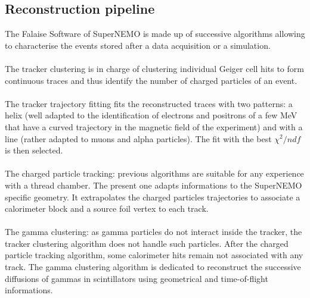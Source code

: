 \subsection{Reconstruction pipeline}

The Falaise Software of SuperNEMO is made up of successive algorithms allowing to characterise the events stored after a data acquisition or a simulation.
\paragraph{} The tracker clustering is in charge of clustering individual Geiger cell hits to form continuous traces and thus identify the number of charged particles of an event.
\paragraph{} The tracker trajectory fitting fits the reconstructed traces with two patterns: a helix (well adapted to the identification of electrons and positrons of a few MeV that have a curved trajectory in the magnetic field of the experiment) and with a line (rather adapted to muons and alpha particles).
The fit with the best $\chi^{2}/ndf$ is then selected.
\paragraph{} The charged particle tracking: previous algorithms are suitable for any experience with a thread chamber.
The present one adapts informations to the SuperNEMO specific geometry.
It extrapolates the charged particles trajectories to associate a calorimeter block and a source foil vertex to each track.
\paragraph{} The gamma clustering: as gamma particles do not interact inside the tracker, the tracker clustering algorithm does not handle such particles.
After the charged particle tracking algorithm, some calorimeter hits remain not associated with any track.
The gamma clustering algorithm is dedicated to reconstruct the successive diffusions of gammas in scintillators using geometrical and time-of-flight informations.
